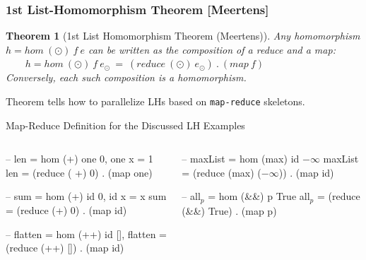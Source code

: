 \documentclass{beamer}
\renewcommand{\emph}[1]{\textcolor{structure}{#1}}
\newcommand{\emp}[1]{\textcolor{DikuRed}{ #1}}
\newcommand{\mymath}[1]{$ #1 $}
\newcommand{\myindx}[1]{_{#1}}
\newtheorem{mytheo}{Theorem}
\begin{document}
\begin{frame}[fragile,t]
  \frametitle{1st List-Homomorphism Theorem [Meertens]}

\begin{mytheo}[1st List Homomorphism Theorem (Meertens)]\label{LHomTh1}
Any homomorphism \emp{$h = hom \ (\odot) \ f \ e$} can be written 
as the composition of a reduce and a map: \\
\emp{$\ \ \ \ \ \ \ \ \ h = hom \ (\odot) \ f \ e_{\odot} \ = \ (reduce \ (\odot) \ e_{\odot}) \ . \ (map \ f)$} \\
Conversely, each such composition is a homomorphism. \\
\end{mytheo}

\bigskip

Theorem tells how to parallelize LHs based on {\tt map-reduce} skeletons.

\bigskip

\begin{block}{Map-Reduce Definition for the Discussed LH Examples} \vspace{-1.5 ex}
\begin{columns}
\begin{colorcode}[fontsize=\scriptsize]
-- len = hom \emp{(+)} \emph{one} \emp{0}, one x = 1
len = \emp{(reduce (\emp{+}) 0)} . \emph{(map one)}

-- sum = hom \emp{(+)} \emph{id} \emp{0}, id x = x
sum = \emp{(reduce (+) 0)} . \emph{(map id)}

-- flatten = hom \emp{(++)} \emph{id} \emp{[]},
flatten = \emp{(reduce (++) [])} . \emph{(map id)}
\end{colorcode}
\begin{colorcode}[fontsize=\scriptsize]
-- maxList = hom \emp{(max)} \emph{id} \emp{\mymath{-\infty}}
maxList = \emp{(reduce (max) (\mymath{-\infty})}) . 
          \emph{(map id)}

-- all\mymath{\myindx{p}} = hom \emp{(&&)} \emph{p} \emp{True}
all\mymath{\myindx{p}} = \emp{(reduce (&&) True)} . 
       \emph{(map p)}

\end{colorcode}
\end{columns}
\end{block}

\end{frame}
\end{document}

